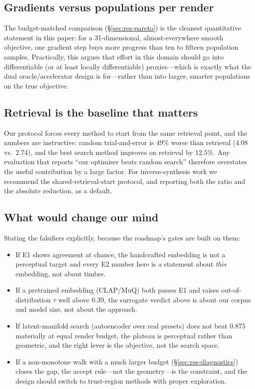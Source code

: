 \documentclass[11pt]{article}
\newcommand{\nInit}{2.74}
\newcommand{\nRand}{4.08}
\newcommand{\rGT}{0.875}
\begin{document}
\subsection{Gradients versus populations per render}

The budget-matched comparison (\S\ref{sec:res-pareto}) is the cleanest
quantitative statement in this paper: for a 31-dimensional, almost-everywhere
smooth objective, one gradient step buys more progress than ten to fifteen
population samples. Practically, this argues that effort in this domain should
go into differentiable (or at least locally differentiable) proxies---which is
exactly what the dual oracle/accelerator design is for---rather than into
larger, smarter populations on the true objective.

\subsection{Retrieval is the baseline that matters}\label{sec:disc-retrieval}

Our protocol forces every method to start from the same retrieval point, and the
numbers are instructive: random trial-and-error is $49\%$ worse than retrieval
(\nRand{} vs.\ \nInit), and the best search method improves on retrieval by
$12.5\%$. Any evaluation that reports ``our optimiser beats random search''
therefore overstates the useful contribution by a large factor. For
inverse-synthesis work we recommend the shared-retrieval-start protocol, and
reporting both the ratio and the absolute reduction, as a default.

\subsection{What would change our mind}\label{sec:disc-falsify}

Stating the falsifiers explicitly, because the roadmap's gates are built on
them:

\begin{itemize}
\item If E1 shows agreement at chance, the handcrafted embedding is not a
  perceptual target and every E2 number here is a statement about \emph{this}
  embedding, not about timbre.
\item If a pretrained embedding (CLAP/MuQ) both passes E1 and raises
  out-of-distribution $\tau$ well above $0.39$, the surrogate verdict above is
  about our corpus and model size, not about the approach.
\item If latent-manifold search (autoencoder over real presets) does not beat
  \rGT{} materially at equal render budget, the plateau is perceptual rather
  than geometric, and the right lever is the objective, not the search space.
\item If a non-monotone walk with a much larger budget
  (\S\ref{sec:res-diagnostics}) closes the gap, the accept rule---not the
  geometry---is the constraint, and the design should switch to trust-region
  methods with proper exploration.
\end{itemize}
\end{document}
